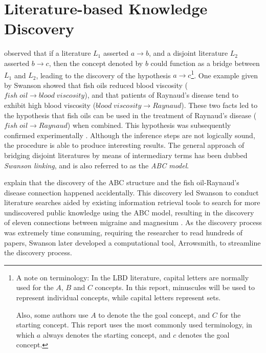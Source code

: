 \chapter{Literature-based Knowledge Discovery}


\citet{swa86a} observed that if a literature $L_1$ asserted $a \to b$, and a disjoint literature $L_2$ asserted $b \to c$, then the concept denoted by $b$ could function as a bridge between $L_1$ and $L_2$, leading to the discovery of the hypothesis $a \to c$\footnote{A note on terminology: In the LBD literature, capital letters are normally used for the $A$, $B$ and $C$ concepts. In this report, minuscules will be used to represent individual concepts, while capital letters represent sets. 

Also, some authors use $A$ to denote the the goal concept, and $C$ for the starting concept. This report uses the most commonly used terminology, in which $a$ always denotes the starting concept, and $c$ denotes the goal concept.}. One example given by Swanson showed that fish oils reduced blood viscosity ($fish\;oil \to blood\;viscosity$), and that patients of Raynaud's disease tend to exhibit high blood viscosity ($blood\;viscosity \to Raynaud$). These two facts led to the hypothesis that fish oils can be used in the treatment of Raynaud's disease ($fish\;oil \to Raynaud$) when combined. This hypothesis was subsequently confirmed experimentally \cite{dig89}. Although the inference steps are not logically sound, the procedure is able to produce interesting results. The general approach of bridging disjoint literatures by means of intermediary terms has been dubbed \emph{Swanson linking}, and is also referred to as the \emph{ABC model}.

\citet{swa97} explain that the discovery of the ABC structure and the fish oil-Raynaud's disease connection happened accidentally. This discovery led Swanson to conduct literature searches aided by existing information retrieval tools to search for more undiscovered public knowledge using the ABC model, resulting in the discovery of eleven connections between migraine and magnesium \cite{swa88}. As the discovery process was extremely time consuming, requiring the researcher to read hundreds of papers, Swanson later developed a computational tool, Arrowsmith, to streamline the discovery process.

